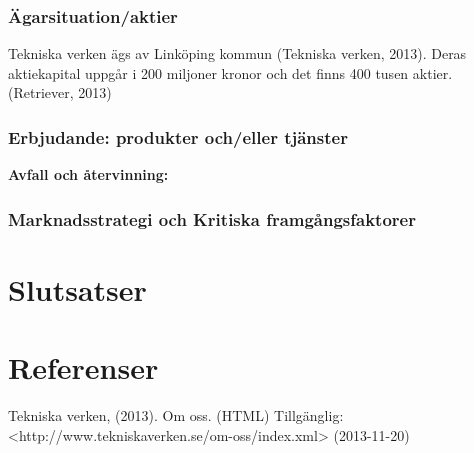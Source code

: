 \documentclass[10pt,a4paper]{article}
\begin{document}
\subsubsection{Ägarsituation/aktier}
Tekniska verken ägs av Linköping kommun (Tekniska verken, 2013). Deras
aktiekapital uppgår i 200 miljoner kronor och det finns 400 tusen
aktier.(Retriever, 2013)

\subsubsection{Erbjudande: produkter och/eller tjänster}
\textbf{Avfall och återvinning:}

\subsubsection{Marknadsstrategi och Kritiska framgångsfaktorer}


\section{Slutsatser}

\section{Referenser}
Tekniska verken, (2013). Om oss. (HTML) Tillgänglig: \newline
<http://www.tekniskaverken.se/om-oss/index.xml> (2013-11-20)
\end{document}
